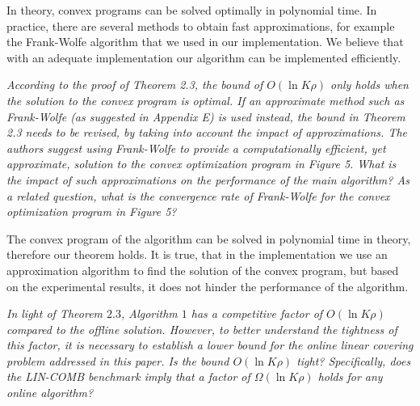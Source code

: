 \documentclass[12pt]{article}
\begin{document}
In theory, convex programs can be solved optimally in polynomial time. In practice, there are several methods to obtain fast approximations, for example the Frank-Wolfe algorithm that we used in our implementation. We believe that with an adequate implementation our algorithm can be implemented efficiently.

\textit{\color{red}
According to the proof of Theorem 2.3, the bound of $O(\ln K\rho)$ only holds when the solution to the convex program is optimal. If an approximate method such as Frank-Wolfe (as suggested in Appendix E) is used instead, the bound in Theorem 2.3 needs to be revised, by taking into account the impact of approximations. The authors suggest using Frank-Wolfe to provide a computationally efficient, yet approximate, solution to the convex optimization program in Figure 5. What is the impact of such approximations on the performance of the main algorithm? As a related question, what is the convergence rate of Frank-Wolfe for the convex optimization program in Figure 5?
}

The convex program of the algorithm can be solved in polynomial time in theory, therefore our theorem holds. It is true, that in the implementation we use an approximation algorithm to find the solution of the convex program, but based on the experimental results, it does not hinder the performance of the algorithm.  

\textit{\color{red}
In light of Theorem $2.3$, Algorithm $1$ has a competitive factor of $O(\ln K\rho)$ compared to the offline solution. However, to better understand the tightness of this factor, it is necessary to establish a lower bound for the online linear covering problem addressed in this paper.
Is the bound $O(\ln K\rho)$ tight? Specifically, does the LIN-COMB benchmark imply that a factor of $\Omega(\ln K\rho)$ holds for any online algorithm?}
\end{document}
